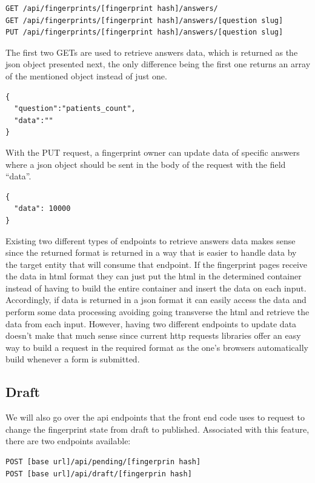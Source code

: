 \begin{verbatim}
GET /api/fingerprints/[fingerprint hash]/answers/
GET /api/fingerprints/[fingerprint hash]/answers/[question slug]
PUT /api/fingerprints/[fingerprint hash]/answers/[question slug]
\end{verbatim}

The first two GETs are used to retrieve answers data, which is returned as the \gls{json} object presented next, the only difference being the first one returns an array of the mentioned object instead of just one.

\begin{verbatim}
{
  "question":"patients_count",
  "data":""
}
\end{verbatim}

With the PUT request, a fingerprint owner can update data of specific answers where a \gls{json} object should be sent in the body of the request with the field ``data''.

\begin{verbatim}
{
  "data": 10000
}
\end{verbatim}

Existing two different types of endpoints to retrieve answers data makes sense since the returned format is returned in a way that is easier to handle data by the target entity that will consume that endpoint.
If the fingerprint pages receive the data in \gls{html} format they can just put the \gls{html} in the determined container instead of having to build the entire container and insert the data on each input.
Accordingly, if data is returned in a \gls{json} format it can easily access the data and perform some data processing avoiding going transverse the \gls{html} and retrieve the data from each input.
However, having two different endpoints to update data doesn't make that much sense since current \gls{http} requests libraries offer an easy way to build a request in the required format as the one's browsers automatically build whenever a form is submitted.

\subsection*{Draft}

We will also go over the \gls{api} endpoints that the front end code uses to request to change the fingerprint state from draft to published.
Associated with this feature, there are two endpoints available:

\begin{verbatim}
POST [base url]/api/pending/[fingerprin hash]
POST [base url]/api/draft/[fingerprin hash]
\end{verbatim}


